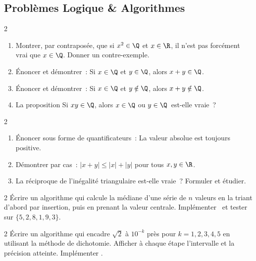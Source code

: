 \subsection*{Probl\`emes Logique \& Algorithmes}

\begin{probleme}{2}
\begin{enumerate}
  \item Montrer, par contrapos\'ee, que si $x^2\in\Q$ et $x\in\R$,
        il n'est pas forc\'ement vrai que $x\in\Q$.
        Donner un contre-exemple.
  \item \'Enoncer et d\'emontrer~:
        \og Si $x\in\Q$ et $y\in\Q$, alors $x+y\in\Q$.\fg
  \item \'Enoncer et d\'emontrer~:
        \og Si $x\in\Q$ et $y\notin\Q$, alors $x+y\notin\Q$.\fg
  \item La proposition \og Si $xy\in\Q$, alors $x\in\Q$ ou $y\in\Q$\fg\ est-elle vraie~?
\end{enumerate}
\end{probleme}

\begin{probleme}{2}
\begin{enumerate}
  \item \'Enoncer sous forme de quantificateurs~:
        \og La valeur absolue est toujours positive.\fg
  \item D\'emontrer par cas~: $|x+y|\leq|x|+|y|$ pour tous $x,y\in\R$.
  \item La r\'eciproque de l'in\'egalit\'e triangulaire est-elle vraie~?
        Formuler et \'etudier.
\end{enumerate}
\end{probleme}

\begin{probleme}{2}
\'Ecrire un algorithme qui calcule la m\'ediane d'une s\'erie de $n$ valeurs
en la triant d'abord par insertion, puis en prenant la valeur centrale.
Impl\'ementer \computer\ et tester sur $\{5,2,8,1,9,3\}$.
\end{probleme}

\begin{probleme}{2}
\'Ecrire un algorithme qui encadre $\sqrt{2}$ \`a $10^{-k}$ pr\`es
pour $k=1,2,3,4,5$ en utilisant la m\'ethode de dichotomie.
Afficher \`a chaque \'etape l'intervalle et la pr\'ecision atteinte.
Impl\'ementer \computer.
\end{probleme}

